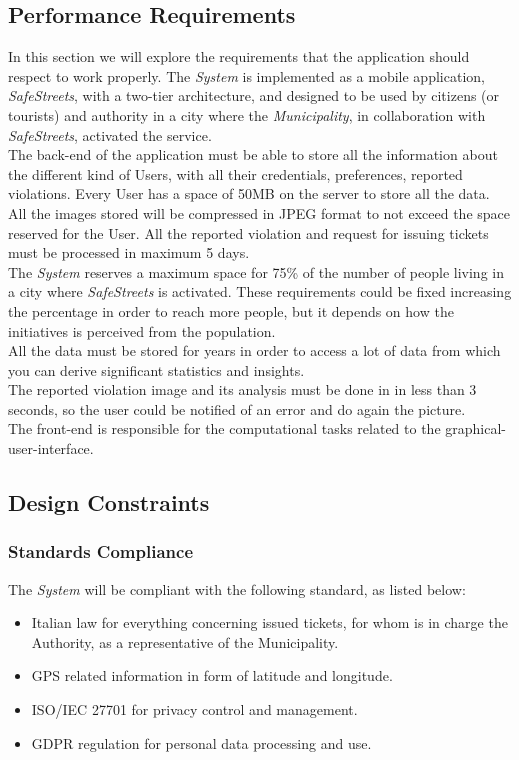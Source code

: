 \documentclass {article}
\begin{document}
	\subsection{Performance Requirements}
	In this section we will explore the requirements that the application should respect to work properly. The {\it System} is implemented as a mobile application, {\it SafeStreets}, with a two-tier architecture, and designed to be used by citizens (or tourists) and authority in a city where the {\it Municipality}, in collaboration with {\it SafeStreets}, activated the service. \\
	The back-end of the application must be able to store all the information about the different kind of Users, with all their credentials, preferences, reported violations. Every User has a space of 50MB on the server to store all the data. All the images stored will be compressed in JPEG format to not exceed the space reserved for the User. All the reported violation and request for issuing tickets must be processed in maximum 5 days.\\ 
	The {\it System} reserves a maximum space for 75\% of the number of people living in a city where {\it SafeStreets} is activated. These requirements could be fixed increasing the percentage in order to reach more people, but it depends on how the initiatives is perceived from the population. \\
	All the data must be stored for years in order to access a lot of data from which you can derive significant statistics and insights. \\ 
	The reported violation image and its analysis must be done in in less than 3 seconds, so the user could be notified of an error and do again the picture. \\
	The front-end is responsible for the computational tasks related to the graphical-user-interface.
	\subsection{Design Constraints}
	\subsubsection{Standards Compliance}
	The {\it System} will be compliant with the following standard, as listed below:
	\begin{itemize}
		\item Italian law for everything concerning issued tickets, for whom is in charge the Authority, as a representative of the Municipality.
		\item GPS related information in form of latitude and longitude.
		\item ISO/IEC 27701 for privacy control and management.
		\item GDPR regulation for personal data processing and use.
	\end{itemize}
\end{document}
